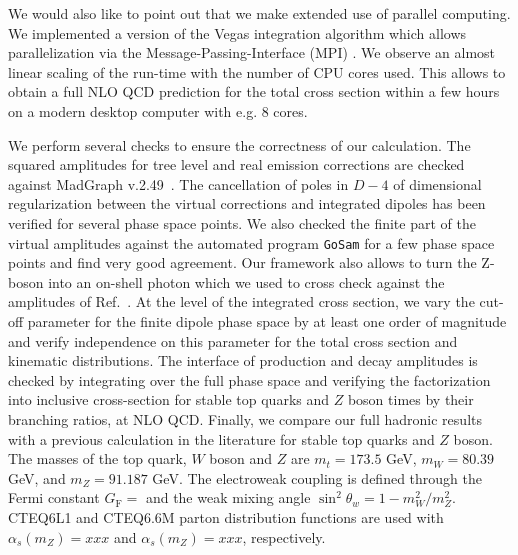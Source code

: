 \documentclass[preprint]{JHEP3} %
\begin{document}
We would also like to point out that we make extended use of parallel computing. 
We implemented a version of the Vegas integration algorithm which allows parallelization via the Message-Passing-Interface (MPI) \cite{}. 
We observe an almost linear scaling of the run-time with the number of CPU cores used. 
This allows to obtain a full NLO QCD prediction for the total cross section within a few hours on a modern desktop computer with e.g. 8 cores.

We perform several checks to ensure the correctness of our calculation. 
The squared amplitudes for tree level and real emission corrections are checked against MadGraph v.2.49~\cite{Stelzer:1994ta}. 
The cancellation of poles in $D-4$ of dimensional regularization between the virtual corrections and integrated dipoles has been verified for several phase space points.
We also checked the finite part of the virtual amplitudes against the automated program {\tt GoSam} \cite{Cullen:2011ac} for a few phase space points and find
very good agreement. 
Our framework also allows to turn the Z-boson into an on-shell photon which we used to cross check against the amplitudes of Ref.~\cite{Melnikov.Scharf}. 
At the level of the integrated cross section, we vary the cut-off parameter for the finite dipole phase space by at least one order of magnitude and 
verify independence on this parameter for the total cross section and kinematic distributions.
The interface of production and decay amplitudes is checked by integrating over the full phase space and verifying the factorization into 
inclusive cross-section for stable top quarks and $Z$ boson times by their branching ratios, at NLO QCD.
% 
Finally, we compare our full hadronic results with a previous calculation \cite{1208} in the literature for stable top quarks and $Z$ boson.
The masses of the top quark, $W$ boson and $Z$ are $m_t=173.5$ GeV, $m_W=80.39$ GeV, and $m_Z=91.187$ GeV. 
The electroweak coupling is defined through the Fermi constant $G_\mathrm{F}=$ and the weak mixing angle $\sin^2\theta_w = 1-m_W^2/m_Z^2$. 
CTEQ6L1 \cite{} and CTEQ6.6M \cite{} parton distribution functions are used with $\alpha_s(m_Z)=xxx$ and $\alpha_s(m_Z)=xxx$, respectively. 
\end{document}
